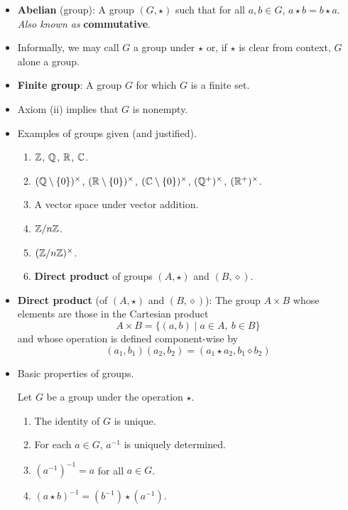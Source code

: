 \documentclass[../notes.tex]{subfiles}
\begin{document}
\begin{itemize}
    \item \textbf{Abelian} (group): A group $(G,\star)$ such that for all $a,b\in G$, $a\star b=b\star a$. \emph{Also known as} \textbf{commutative}.
    \item Informally, we may call $G$ a group under $\star$ or, if $\star$ is clear from context, $G$ alone a group.
    \item \textbf{Finite group}: A group $G$ for which $G$ is a finite set.
    \item Axiom (ii) implies that $G$ is nonempty.
    \item Examples of groups given (and justified).
    \begin{enumerate}
        \item $\mathbb{Z}$, $\mathbb{Q}$, $\mathbb{R}$, $\mathbb{C}$.
        \item $(\mathbb{Q}\setminus\{0\})^\times$, $(\mathbb{R}\setminus\{0\})^\times$, $(\mathbb{C}\setminus\{0\})^\times$, $(\mathbb{Q}^+)^\times$, $(\mathbb{R}^+)^\times$.
        \item A vector space under vector addition.
        \item $\mathbb{Z}/n\mathbb{Z}$.
        \item $(\mathbb{Z}/n\mathbb{Z})^\times$.
        \item \textbf{Direct product} of groups $(A,\star)$ and $(B,\diamond)$.
    \end{enumerate}
    \item \textbf{Direct product} (of $(A,\star)$ and $(B,\diamond)$): The group $A\times B$ whose elements are those in the Cartesian product
    \begin{equation*}
        A\times B = \{(a,b)\mid a\in A,\ b\in B\}
    \end{equation*}
    and whose operation is defined component-wise by
    \begin{equation*}
        (a_1,b_1)(a_2,b_2) = (a_1\star a_2,b_1\diamond b_2)
    \end{equation*}
    \item Basic properties of groups.
    \begin{proposition}\label{prp:1.1}
        Let $G$ be a group under the operation $\star$.
        \begin{enumerate}
            \item The identity of $G$ is unique.
            \item For each $a\in G$, $a^{-1}$ is uniquely determined.
            \item $(a^{-1})^{-1}=a$ for all $a\in G$.
            \item $(a\star b)^{-1}=(b^{-1})\star(a^{-1})$.

\end{enumerate}
\end{proposition}
\end{itemize}
\end{document}
